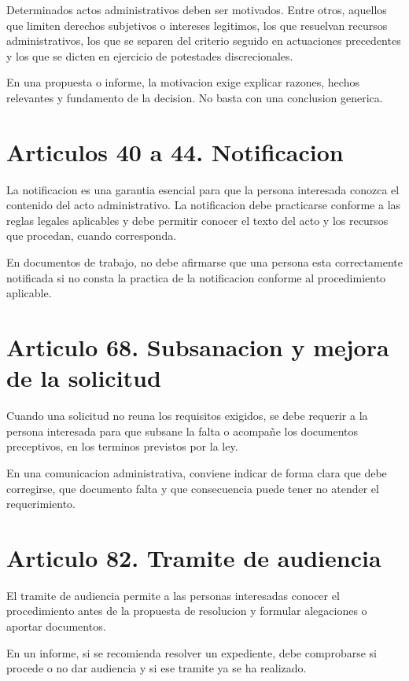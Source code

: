 \documentclass[a4paper,12pt]{article}
\begin{document}
Determinados actos administrativos deben ser motivados. Entre otros, aquellos que limiten derechos subjetivos o intereses legitimos, los que resuelvan recursos administrativos, los que se separen del criterio seguido en actuaciones precedentes y los que se dicten en ejercicio de potestades discrecionales.

En una propuesta o informe, la motivacion exige explicar razones, hechos relevantes y fundamento de la decision. No basta con una conclusion generica.

\section*{Articulos 40 a 44. Notificacion}

La notificacion es una garantia esencial para que la persona interesada conozca el contenido del acto administrativo. La notificacion debe practicarse conforme a las reglas legales aplicables y debe permitir conocer el texto del acto y los recursos que procedan, cuando corresponda.

En documentos de trabajo, no debe afirmarse que una persona esta correctamente notificada si no consta la practica de la notificacion conforme al procedimiento aplicable.

\section*{Articulo 68. Subsanacion y mejora de la solicitud}

Cuando una solicitud no reuna los requisitos exigidos, se debe requerir a la persona interesada para que subsane la falta o acompañe los documentos preceptivos, en los terminos previstos por la ley.

En una comunicacion administrativa, conviene indicar de forma clara que debe corregirse, que documento falta y que consecuencia puede tener no atender el requerimiento.

\section*{Articulo 82. Tramite de audiencia}

El tramite de audiencia permite a las personas interesadas conocer el procedimiento antes de la propuesta de resolucion y formular alegaciones o aportar documentos.

En un informe, si se recomienda resolver un expediente, debe comprobarse si procede o no dar audiencia y si ese tramite ya se ha realizado.
\end{document}
